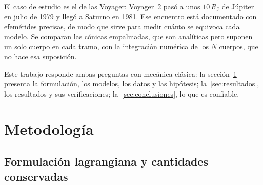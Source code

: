 \documentclass[11pt,letterpaper]{article}
\newcommand{\RJ}{R_{\mathrm J}}
\begin{document}
El caso de estudio es el de las Voyager: Voyager~2 pasó a unos $10\,\RJ$ de Júpiter en julio de
1979 y llegó a Saturno en 1981. Ese encuentro está documentado con efemérides precisas, de modo
que sirve para medir cuánto se equivoca cada modelo. Se comparan las cónicas empalmadas, que son
analíticas pero suponen un solo cuerpo en cada tramo, con la integración numérica de los $N$
cuerpos, que no hace esa suposición.

Este trabajo responde ambas preguntas con mecánica clásica: la sección~\ref{sec:metodo} presenta la formulación, los modelos, los datos y las hipótesis; la~\ref{sec:resultados}, los resultados y sus verificaciones; la~\ref{sec:conclusiones}, lo que es confiable.

\section{Metodología}\label{sec:metodo}

\subsection{Formulación lagrangiana y cantidades conservadas}
\end{document}

